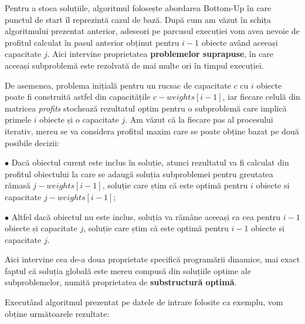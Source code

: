 Pentru a stoca soluțiile, algoritmul folosește abordarea Bottom-Up în care punctul de start îl reprezintă cazul de bază. După cum am văzut în schița algoritmului prezentat anterior, adeseori pe parcusul execuției vom avea nevoie de profitul calculat în pasul anterior obținut pentru \(i - 1\) obiecte având aceeași capacitate \(j\). Aici intervine proprietatea \textbf{problemelor suprapuse}, în care aceeași subproblemă este rezolvată de mai multe ori în timpul execuției. \par
De asemenea, problema inițială pentru un rucsac de capacitate \(c\) cu \(i\) obiecte poate fi construită astfel din capacitățile \(c - weights[i - 1]\), 
iar fiecare celulă din matricea \textit{profits} stochează rezultatul optim pentru o subproblemă care implică primele \(i\) obiecte și o capacitate \(j\). Am văzut că la fiecare pas al procesului iterativ, mereu se va considera profitul maxim care se poate obține bazat pe două posibile decizii: \par
$\bullet$ Dacă obiectul curent este inclus în soluție, atunci rezultatul va fi calculat din profitul obiectului la care se adaugă soluția subproblemei pentru greutatea rămasă \(j - weights[i - 1]\), soluție care știm că este optimă pentru \(i\) obiecte si capacitate \(j - weights[i - 1]\); \par
$\bullet$ Altfel dacă obiectul nu este inclus, soluția va rămâne aceeași ca cea pentru \(i - 1\) obiecte și capacitate \(j\), soluție care știm că este optimă pentru \(i - 1\) obiecte si capacitate \(j\). \par
Aici intervine cea de-a doua proprietate specifică programării dinamice, mai exact faptul că soluția globală este mereu compusă din soluțiile optime ale subproblemelor, numită proprietatea de \textbf{substructură optimă}.
\par
Executând algoritmul prezentat pe datele de intrare folosite ca exemplu, vom obține următoarele rezultate:


